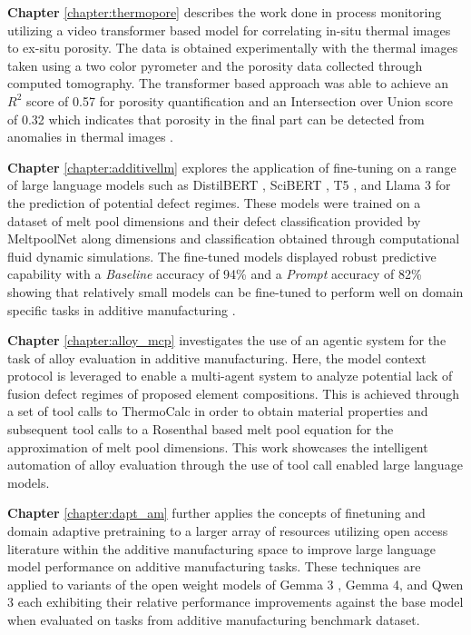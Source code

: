 \clearpage

\textbf{Chapter} \ref{chapter:thermopore} describes the work done in process
monitoring utilizing a video transformer based model for correlating
in-situ thermal images to ex-situ porosity. The data is
obtained experimentally with the thermal images taken using a two color
pyrometer and the porosity data collected through computed tomography. The
transformer based approach was able to achieve an $R^2$ score of 0.57 for
porosity quantification and an Intersection over Union score of 0.32 which
indicates that porosity in the final part can be detected from anomalies in
thermal images \cite{pak_thermopore_2024}.

\textbf{Chapter} \ref{chapter:additivellm} explores the application of
fine-tuning on a range of large language models such as DistilBERT
\cite{sanh_distilbert_2020}, SciBERT \cite{beltagy_scibert_2019}, T5
\cite{raffel_exploring_2023}, and Llama 3 \cite{grattafiori_llama_2024} for the
prediction of potential defect regimes. These models were trained on a dataset
of melt pool dimensions and their defect classification provided by MeltpoolNet
\cite{akbari_meltpoolnet_2022} along dimensions and classification obtained
through computational fluid dynamic simulations. The fine-tuned models displayed
robust predictive capability with a \textit{Baseline} accuracy of 94\% and a
\textit{Prompt} accuracy of 82\% showing that relatively small models can be
fine-tuned to perform well on domain specific tasks in additive manufacturing
\cite{pak_additivellm_2025}.

\textbf{Chapter} \ref{chapter:alloy_mcp} investigates the use of an agentic
system for the task of alloy evaluation in additive manufacturing. Here, the
model context protocol is leveraged to enable a multi-agent system to analyze
potential lack of fusion defect regimes of proposed element compositions. This
is achieved through a set of tool calls to ThermoCalc
\cite{thermo-calc_software_thermo-calc_2025} in order to obtain material
properties and subsequent tool calls to a Rosenthal based melt pool equation for
the approximation of melt pool dimensions. This work showcases the intelligent
automation of alloy evaluation through the use of tool call enabled large
language models.

\textbf{Chapter} \ref{chapter:dapt_am} further applies the concepts of
finetuning and domain adaptive pretraining to a larger array of resources
utilizing open access literature within the additive manufacturing space to
improve large language model performance on additive manufacturing tasks. These
techniques are applied to variants of the open weight models of Gemma 3
\cite{team_gemma_2025}, Gemma 4, and Qwen 3 \cite{yang_qwen3_2025} each
exhibiting their relative performance improvements against the base model when
evaluated on tasks from additive manufacturing benchmark dataset.

